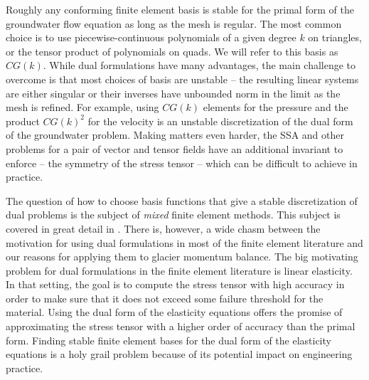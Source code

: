 \documentclass{article}
\theoremstyle{definition}
\theoremstyle{plain}
\begin{document}
Roughly any conforming finite element basis is stable for the primal form of the groundwater flow equation as long as the mesh is regular.
The most common choice is to use piecewise-continuous polynomials of a given degree $k$ on triangles, or the tensor product of polynomials on quads.
We will refer to this basis as $CG(k)$.
While dual formulations have many advantages, the main challenge to overcome is that most choices of basis are unstable -- the resulting linear systems are either singular or their inverses have unbounded norm in the limit as the mesh is refined.
For example, using $CG(k)$ elements for the pressure and the product $CG(k)^2$ for the velocity is an unstable discretization of the dual form of the groundwater problem.
Making matters even harder, the SSA and other problems for a pair of vector and tensor fields have an additional invariant to enforce -- the symmetry of the stress tensor -- which can be difficult to achieve in practice.

The question of how to choose basis functions that give a stable discretization of dual problems is the subject of \emph{mixed} finite element methods.
This subject is covered in great detail in \citet{boffi2013mixed}.
There is, however, a wide chasm between the motivation for using dual formulations in most of the finite element literature and our reasons for applying them to glacier momentum balance.
The big motivating problem for dual formulations in the finite element literature is linear elasticity.
In that setting, the goal is to compute the stress tensor with high accuracy in order to make sure that it does not exceed some failure threshold for the material.
Using the dual form of the elasticity equations offers the promise of approximating the stress tensor with a higher order of accuracy than the primal form.
Finding stable finite element bases for the dual form of the elasticity equations is a holy grail problem because of its potential impact on engineering practice.
\end{document}
